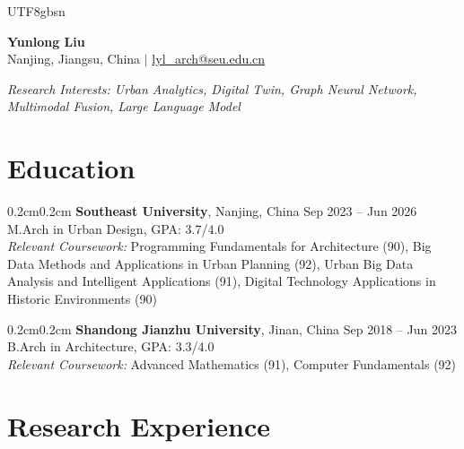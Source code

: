 \documentclass[10pt, letterpaper]{article}
\newenvironment{onecolentry}{\begin{adjustwidth}{0.2cm}{0.2cm}}{\end{adjustwidth}}
\begin{document}
\begin{CJK*}{UTF8}{gbsn}

\begin{center}
    {\fontsize{24pt}{24pt}\selectfont \textbf{Yunlong Liu}}\\[4pt]
    {\footnotesize Nanjing, Jiangsu, China $|$ \href{mailto:lyl_arch@seu.edu.cn}{lyl\_arch@seu.edu.cn}}
\end{center}

\vspace{-0.3cm}
\begin{center}
    \textit{Research Interests: Urban Analytics, Digital Twin, Graph Neural Network, Multimodal Fusion, Large Language Model}
\end{center}

\section{Education}
\begin{onecolentry}
    \textbf{Southeast University}, Nanjing, China \hfill Sep 2023 -- Jun 2026\\
    M.Arch in Urban Design, GPA: 3.7/4.0\\
    \textit{Relevant Coursework:} Programming Fundamentals for Architecture (90), Big Data Methods and Applications in Urban Planning (92), Urban Big Data Analysis and Intelligent Applications (91), Digital Technology Applications in Historic Environments (90)
\end{onecolentry}

\vspace{0.3\baselineskip}
\begin{onecolentry}
    \textbf{Shandong Jianzhu University}, Jinan, China \hfill Sep 2018 -- Jun 2023\\
    B.Arch in Architecture, GPA: 3.3/4.0\\
    \textit{Relevant Coursework:} Advanced Mathematics (91), Computer Fundamentals (92)
\end{onecolentry}

\section{Research Experience}


\end{CJK*}
\end{document}
